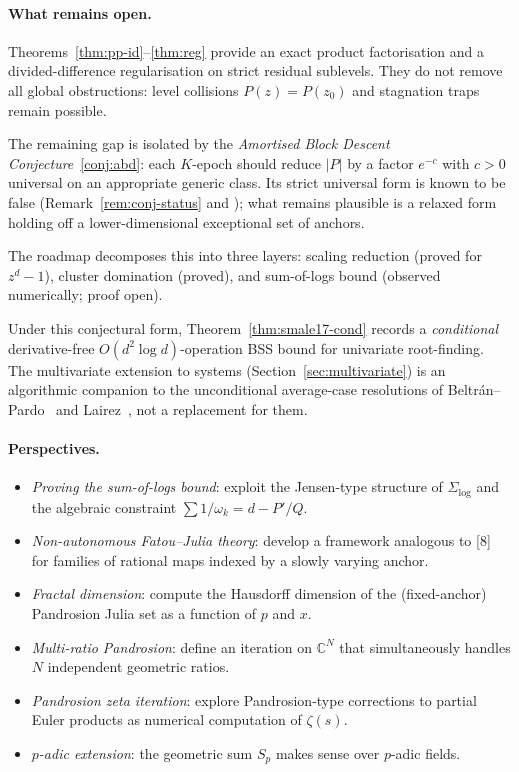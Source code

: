 \documentclass[11pt,a4paper]{article}
\begin{document}
\paragraph{What remains open.} Theorems~\ref{thm:pp-id}--\ref{thm:reg} provide an exact product factorisation and a divided-difference regularisation on strict residual sublevels. They do not remove all global obstructions: level collisions $P(z)=P(z_0)$ and stagnation traps remain possible.

The remaining gap is isolated by the \emph{Amortised Block Descent Conjecture}~\ref{conj:abd}: each $K$-epoch should reduce $|P|$ by a factor $e^{-c}$ with $c > 0$ universal on an appropriate generic class. Its strict universal form is known to be false (Remark~\ref{rem:conj-status} and \cite{besevic7}); what remains plausible is a relaxed form holding off a lower-dimensional exceptional set of anchors.

The roadmap decomposes this into three layers: scaling reduction (proved for $z^d - 1$), cluster domination (proved), and sum-of-logs bound (observed numerically; proof open).

Under this conjectural form, Theorem~\ref{thm:smale17-cond} records a \emph{conditional} derivative-free $O(d^2 \log d)$-operation BSS bound for univariate root-finding. The multivariate extension to systems (Section~\ref{sec:multivariate}) is an algorithmic companion to the unconditional average-case resolutions of Beltr\'an--Pardo~\cite{beltranpardo} and Lairez~\cite{lairez}, not a replacement for them.

\paragraph{Perspectives.}
\begin{itemize}
\item \emph{Proving the sum-of-logs bound}: exploit the Jensen-type structure of $\Sigma_{\log}$ and the algebraic constraint $\sum 1/\omega_k = d - P'/Q$.
\item \emph{Non-autonomous Fatou--Julia theory}: develop a framework analogous to [8] for families of rational maps indexed by a slowly varying anchor.
\item \emph{Fractal dimension}: compute the Hausdorff dimension of the (fixed-anchor) Pandrosion Julia set as a function of $p$ and $x$.
\item \emph{Multi-ratio Pandrosion}: define an iteration on $\mathbb{C}^N$ that simultaneously handles $N$ independent geometric ratios.
\item \emph{Pandrosion zeta iteration}: explore Pandrosion-type corrections to partial Euler products as numerical computation of $\zeta(s)$.
\item \emph{$p$-adic extension}: the geometric sum $S_p$ makes sense over $p$-adic fields.
\end{itemize}
\end{document}

